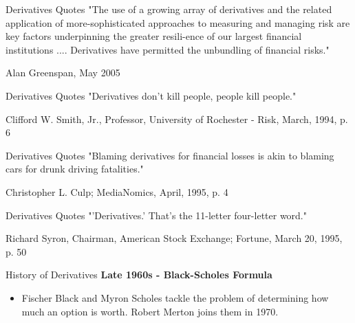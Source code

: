 {Derivatives Quotes}
"The use of a growing array of derivatives and the related application of more-sophisticated approaches to measuring and managing risk are key factors underpinning the greater resili-ence of our largest financial institutions .... Derivatives have permitted the unbundling of financial risks."
\begin{flushright}
  \begin{footnotesize}
  Alan Greenspan, May 2005
 \end{footnotesize}
\end{flushright}



{Derivatives Quotes}
"Derivatives don't kill people, people kill people."
\begin{flushright}
  \begin{footnotesize}
 Clifford W. Smith, Jr., Professor, University of Rochester - Risk, March, 1994, p. 6
 \end{footnotesize}
\end{flushright}



{Derivatives Quotes}
"Blaming derivatives for financial losses is akin to blaming cars for drunk driving fatalities."
\begin{flushright}
  \begin{footnotesize}
 Christopher L. Culp; MediaNomics, April, 1995, p. 4
 \end{footnotesize}
\end{flushright}




{Derivatives Quotes}
"'Derivatives.' That's the 11-letter four-letter word."
\begin{flushright}
  \begin{footnotesize}
  Richard Syron, Chairman, American Stock Exchange; Fortune, March 20, 1995, p. 50
 \end{footnotesize}
\end{flushright}




{History of Derivatives}
\textbf{Late 1960s - Black-Scholes Formula}\\
\begin{itemize}
  \item Fischer Black and Myron Scholes tackle the problem of determining how much an option is worth. Robert Merton joins them in 1970.
\end{itemize}


